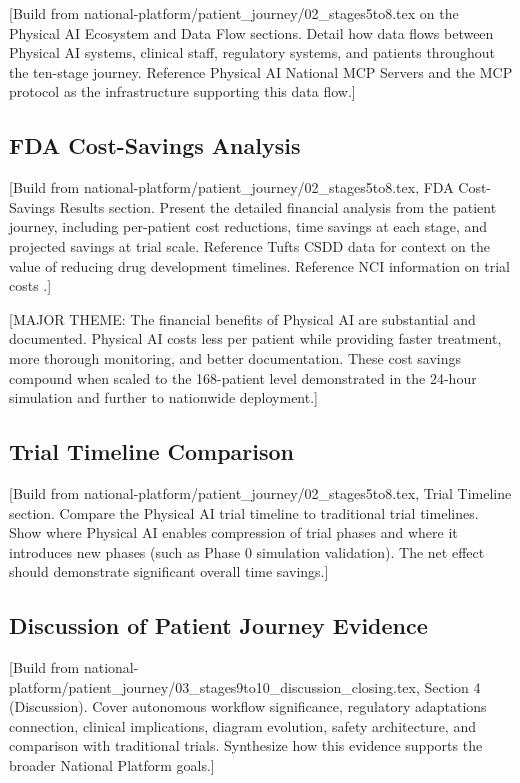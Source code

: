 [Build from national-platform/patient\_journey/02\_stages5to8.tex on the
Physical AI Ecosystem and Data Flow sections. Detail how data flows between
Physical AI systems, clinical staff, regulatory systems, and patients
throughout the ten-stage journey. Reference Physical AI National MCP Servers
\cite{national-mcp-paper} and the MCP protocol \cite{mcp-protocol} as the
infrastructure supporting this data flow.]

\subsection{FDA Cost-Savings Analysis}
\label{subsec:journey-cost}

[Build from national-platform/patient\_journey/02\_stages5to8.tex, FDA
Cost-Savings Results section. Present the detailed financial analysis from
the patient journey, including per-patient cost reductions, time savings at
each stage, and projected savings at trial scale. Reference Tufts CSDD data
\cite{tufts-delay} for context on the value of reducing drug development
timelines. Reference NCI information on trial costs \cite{nci-trials-paying}.]

[MAJOR THEME: The financial benefits of Physical AI are substantial and
documented. Physical AI costs less per patient while providing faster treatment,
more thorough monitoring, and better documentation. These cost savings compound
when scaled to the 168-patient level demonstrated in the 24-hour simulation
and further to nationwide deployment.]

\subsection{Trial Timeline Comparison}
\label{subsec:journey-timeline}

[Build from national-platform/patient\_journey/02\_stages5to8.tex, Trial
Timeline section. Compare the Physical AI trial timeline to traditional trial
timelines. Show where Physical AI enables compression of trial phases and
where it introduces new phases (such as Phase 0 simulation validation). The
net effect should demonstrate significant overall time savings.]

\subsection{Discussion of Patient Journey Evidence}
\label{subsec:journey-discussion}

[Build from national-platform/patient\_journey/03\_stages9to10\_discussion\_closing.tex,
Section 4 (Discussion). Cover autonomous workflow significance, regulatory
adaptations connection, clinical implications, diagram evolution, safety
architecture, and comparison with traditional trials. Synthesize how this
evidence supports the broader National Platform goals.]

